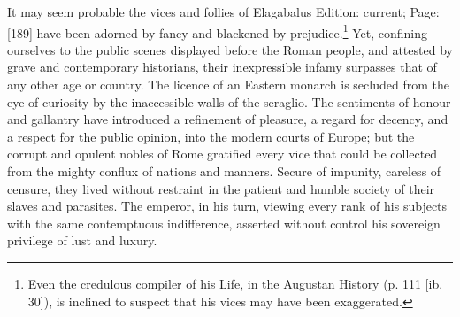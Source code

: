 It may seem probable the vices and follies of Elagabalus Edition: current; Page: [189] have been adorned by fancy and blackened by prejudice.\footnote{Even the credulous compiler of his Life, in the Augustan History (p. 111 [ib. 30]), is inclined to suspect that his vices may have been exaggerated.} Yet, confining ourselves to the public scenes displayed before the Roman people, and attested by grave and contemporary historians, their inexpressible infamy surpasses that of any other age or country. The licence of an Eastern monarch is secluded from the eye of curiosity by the inaccessible walls of the seraglio. The sentiments of honour and gallantry have introduced a refinement of pleasure, a regard for decency, and a respect for the public opinion, into the modern courts of Europe; but the corrupt and opulent nobles of Rome gratified every vice that could be collected from the mighty conflux of nations and manners. Secure of impunity, careless of censure, they lived without restraint in the patient and humble society of their slaves and parasites. The emperor, in his turn, viewing every rank of his subjects with the same contemptuous indifference, asserted without control his sovereign privilege of lust and luxury.

